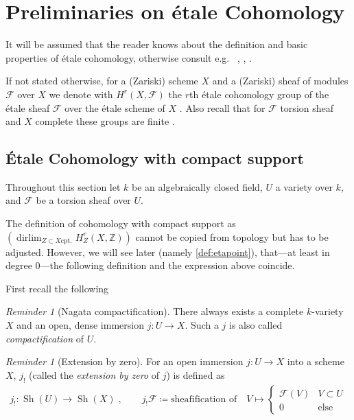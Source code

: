 \documentclass[english,headsepline=0.25pt]{scrartcl}
\theoremstyle{definition}
\theoremstyle{remark}
\newtheorem{Rev}[Def]{Reminder}
\newcommand*{\Z}{\mathds{Z}}
\newcommand*{\F}{\mathcal{F}} %
\DeclareMathOperator*{\dirlim}{dirlim} %
\DeclareMathOperator{\Sh}{Sh} %
\newcommand*{\forexample}{e.g.\ }
\begin{document}
\section{Preliminaries on étale Cohomology}
It will be assumed that the reader knows about the definition and basic
properties of étale cohomology, otherwise consult \forexample
\cite{jannsenetale}, \cite{milne}, \cite{milnebook}.

If not stated otherwise, for a (Zariski) scheme $X$ and a (Zariski)
sheaf of modules $\F$ over $X$ we denote with $H^r(X,\F)$ the $r$th
étale cohomology group of the étale sheaf $\F$ over the étale scheme
of $X$
\cite[compare][Chap.~I.6, Examples of Sheaves on $X_\text{ét}$]{milne}.
Also recall that for $\F$ torsion sheaf and $X$ complete these groups
are finite \cite[][Thm.~I.19.1]{milne}.

\subsection{Étale Cohomology with compact support}
Throughout this section let $k$ be an algebraically closed field,
$U$ a variety over $k$,
and $\F$ be a torsion sheaf over $U$.

The definition of cohomology with compact support as
$\left(\dirlim_{Z\subset X \text{cpt.}}H_Z^r(X,\Z)\right)$
cannot be copied from topology but has to be adjusted.
However, we will see later (namely \ref{def:etapoint}),
that---at least in degree 0---the following definition
and the expression above coincide.

First recall the following
\begin{Rev}[Nagata compactification]\label{nagata}
  There always exists a complete $k$-variety $X$ and an open, dense
  immersion $j\colon U\to X$. Such a $j$ is also called
  \emph{compactification} of $U$.
\end{Rev}
\begin{Rev}[Extension by zero]\label{def:extbyzero}
  For an open immersion $j\colon U\to X$ into
  a scheme $X$, $j_!$ (called the \emph{extension by zero} of $j$)
  is defined as
  \begin{gather*}
    j_!\colon \Sh(U)\to \Sh(X)\;,\qquad
    j_!\F \coloneqq \text{sheafification of}\quad
    V\mapsto\begin{cases}
      \F(V) & V\subset U\\
      0     & \text{else}
    \end{cases}
  \end{gather*}
\end{Rev}
\end{document}
